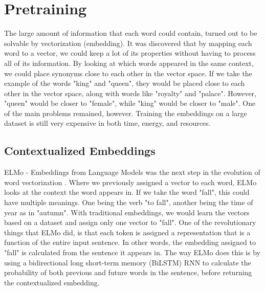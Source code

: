 \documentclass{report}
\begin{document}
\section{Pretraining}
\noindent
The large amount of information that each word could contain, turned out to be solvable by vectorization (embedding). It was discovered that by mapping each word to a vector, we could keep a lot of its properties without having to process all of its information. By looking at which words appeared in the same context, we could place synonyms close to each other in the vector space. If we take the example of the words "king" and "queen", they would be placed close to each other in the vector space, along with words like "royalty" and "palace". However, "queen" would be closer to "female", while "king" would be closer to "male". One of the main problems remained, however. Training the embeddings on a large dataset is still very expensive in both time, energy, and resources.
\noindent
\subsection{Contextualized Embeddings}
ELMo - Embeddings from Language Models was the next step in the evolution of word vectorization \cite{Peters:2018}. Where we previously assigned a vector to each word, ELMo looks at the context the word appears in. If we take the word "fall", this could have multiple meanings. One being the verb "to fall", another being the time of year as in "autumn". With traditional embeddings, we would learn the vectors based on a dataset and assign only one vector to "fall". One of the revolutionary things that ELMo did, is that each token is assigned a representation that is a function of the entire input sentence. In other words, the embedding assigned to "fall" is calculated from the sentence it appears in. The way ELMo does this is by using a bidirectional long short-term memory (BiLSTM) RNN to calculate the probability of both previous and future words in the sentence, before returning the contextualized embedding.
\end{document}
